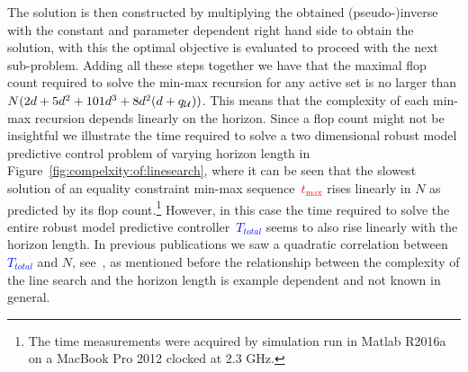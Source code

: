 %
The solution is then constructed by multiplying the obtained (pseudo-)inverse with the constant and parameter dependent right hand side to obtain the solution, with this the optimal objective is evaluated to proceed with the next sub-problem.
%
Adding all these steps together we have that the maximal flop count required to solve the min-max recursion for any active set is no larger than $N(2d+5d^2+101d^3+8d^2(d+q_\mathcal U))$.
%
This means that the complexity of each min-max recursion depends linearly on the horizon.
%
Since a flop count might not be insightful we illustrate the time required to solve a two dimensional robust model predictive control problem of varying horizon length in Figure~\ref{fig:compelxity:of:linesearch}, where it can be seen that the slowest solution of an equality constraint min-max sequence~\textcolor{red}{$t_{\max}$} rises linearly in $N$ as predicted by its flop count.\footnote{%
The time measurements were acquired by simulation run in Matlab R2016a on a MacBook Pro 2012 clocked at 2.3 GHz.}
%
However, in this case the time required to solve the entire robust model predictive controller~\textcolor{blue}{$T_{total}$} seems to also rise linearly with the horizon length.
%
In previous publications we saw a quadratic correlation between~\textcolor{blue}{$T_{total}$} and $N$, see~\cite{Schaich:2015:ifac}, as mentioned before the relationship between the complexity of the line search and the horizon length is example dependent and not known in general.
%
